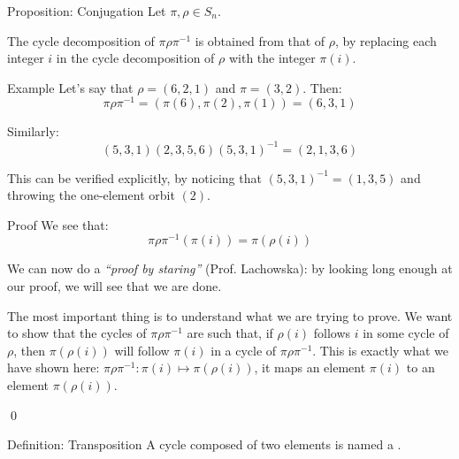 \documentclass[a4paper]{article}
\begin{document}
\begin{parag}{Proposition: Conjugation}
    Let $\pi, \rho \in S_n$.

    The cycle decomposition of $\pi \rho \pi ^{-1}$ is obtained from that of $\rho$, by replacing each integer $i$ in the cycle decomposition of $\rho$ with the integer $\pi\left(i\right)$.

    \begin{subparag}{Example}
        Let's say that $\rho = \left(6, 2, 1\right)$ and $\pi = \left(3, 2\right)$. Then: 
        \[\pi \rho \pi ^{-1} = \left(\pi\left(6\right), \pi\left(2\right), \pi\left(1\right)\right) = \left(6, 3, 1\right)\]

        Similarly:
        \[\left(5, 3, 1\right)\left(2, 3, 5, 6\right)\left(5, 3, 1\right)^{-1} = \left(2, 1, 3, 6\right)\]

        This can be verified explicitly, by noticing that $\left(5, 3, 1\right)^{-1} = \left(1, 3, 5\right)$ and throwing the one-element orbit $\left(2\right)$.
    \end{subparag}
    
    \begin{subparag}{Proof}
        We see that:
        \[\pi \rho \pi^{-1} \left(\pi\left(i\right)\right) = \pi\left(\rho\left(i\right)\right)\]
        
        We can now do a \textit{``proof by staring''} (Prof. Lachowska): by looking long enough at our proof, we will see that we are done.

        The most important thing is to understand what we are trying to prove. We want to show that the cycles of $\pi \rho \pi^{-1}$ are such that, if $\rho\left(i\right)$ follows $i$ in some cycle of $\rho$, then $\pi\left(\rho\left(i\right)\right)$ will follow $\pi\left(i\right)$ in a cycle of $\pi \rho \pi^{-1}$. This is exactly what we have shown here: $\pi \rho \pi^{-1} : \pi\left(i\right) \mapsto \pi\left(\rho\left(i\right)\right)$, it maps an element $\pi\left(i\right)$ to an element $\pi\left(\rho\left(i\right)\right)$.

        \qed
    \end{subparag}
\end{parag}

\begin{parag}{Definition: Transposition}
    A cycle composed of two elements is named a .
\end{parag}
\end{document}
